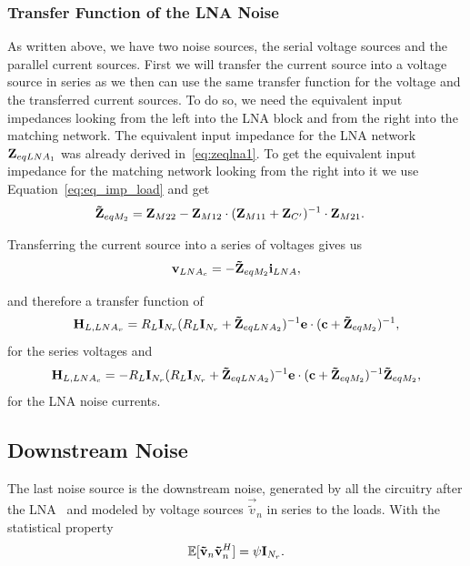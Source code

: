 \subsubsection{Transfer Function of the LNA Noise}
\label{sec:antenna_noise_transf}
As written above, we have two noise sources, the serial voltage sources and the parallel current sources.
First we will transfer the current source into a voltage source in series as we then can use the same transfer function for the voltage and the transferred current sources.
To do so, we need the equivalent input impedances looking from the left into the LNA block and from the right into the matching network.
The equivalent input impedance for the LNA network $\mathbf{Z}_{eqLNA_1}$ was already derived in~\eqref{eq:zeqlna1}.
To get the equivalent input impedance for the matching network looking from the right into it we use Equation~\eqref{eq:eq_imp_load} and get
\begin{align}
\label{eq:zr}
\mathbf{\tilde{Z}}_{eqM_2} &= \mathbf{Z}_{M22} - \mathbf{Z}_{M12}\cdot(\mathbf{Z}_{M11} + \mathbf{Z}_{C'})^{-1}\cdot\mathbf{Z}_{M21}.
\end{align}

Transferring the current source into a series of voltages gives us 
\begin{equation}
\mathbf{v}_{LNA_c} = -\mathbf{\tilde{Z}}_{eqM_2} \mathbf{i}_{LNA},
\end{equation}

and therefore a transfer function of
\begin{equation}
\mathbf{H}_{L,LNA_v} = R_L\mathbf{I}_{N_r}(R_L\mathbf{I}_{N_r} + \mathbf{\tilde{Z}}_{eqLNA_2})^{-1}\mathbf{e}\cdot(\mathbf{c}+\mathbf{\tilde{Z}}_{eqM_2})^{-1},
\end{equation}
for the series voltages and
\begin{equation}
\mathbf{H}_{L,LNA_c} = -R_L\mathbf{I}_{N_r}(R_L\mathbf{I}_{N_r} + \mathbf{\tilde{Z}}_{eqLNA_2})^{-1}\mathbf{e}\cdot(\mathbf{c}+\mathbf{\tilde{Z}}_{eqM_2})^{-1}\mathbf{\tilde{Z}}_{eqM_2},
\end{equation}
for the LNA noise currents.



\subsection{Downstream Noise}
\label{sec:down_noise}
The last noise source is the downstream noise, generated by all the circuitry after the LNA~\cite{Hughes2012} and modeled by voltage sources $\vec{\tilde{v}}_n$ in series to the loads.
With the statistical property
\begin{equation}
\label{eq:cov_down}
\mathbb{E}[\mathbf{\tilde{v}}_n\mathbf{\tilde{v}}_n^H] = \psi\mathbf{I}_{N_r}.
\end{equation}

